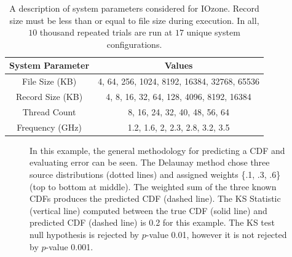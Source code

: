 \documentclass[letterpaper, 10 pt, conference]{IEEEtran}  %
\begin{document}
\begin{table}
  \centering
  \begin{tabular}{c|c}
    \hline
    \textbf{System Parameter} & \textbf{Values}\\
    \hline
    File Size (KB) & 4, 64, 256, 1024, 8192, 16384, 32768, 65536\\
    \hline
    Record Size (KB) & 4, 8, 16, 32, 64, 128, 4096, 8192, 16384\\
    \hline
    Thread Count & 8, 16, 24, 32, 40, 48, 56, 64\\
    \hline
    Frequency (GHz) & 1.2, 1.6, 2, 2.3, 2.8, 3.2, 3.5\\
    \hline
  \end{tabular}
  \caption{A description of system parameters considered for IOzone. Record size must be less than or equal to file size during execution. In all, $10$ thousand repeated trials are run at $17$ unique system configurations.
    \vspace{-.5cm}}
  \label{tab:data_description}
\end{table}


\begin{figure}
  \vspace{-0.3cm}
  \caption{In this example, the general methodology for predicting a CDF and evaluating error can be seen. The Delaunay method chose three source distributions (dotted lines) and assigned weights \{.1, .3, .6\} (top to bottom at middle). The weighted sum of the three known CDFs produces the predicted CDF (dashed line). The KS Statistic (vertical line) computed between the true CDF (solid line) and predicted CDF (dashed line) is 0.2 for this example. The KS test null hypothesis is rejected by $p$-value 0.01, however it is not rejected by $p$-value 0.001.
  \vspace{-.1cm}}
  \label{fig:prediction-example}
\end{figure}
\end{document}

